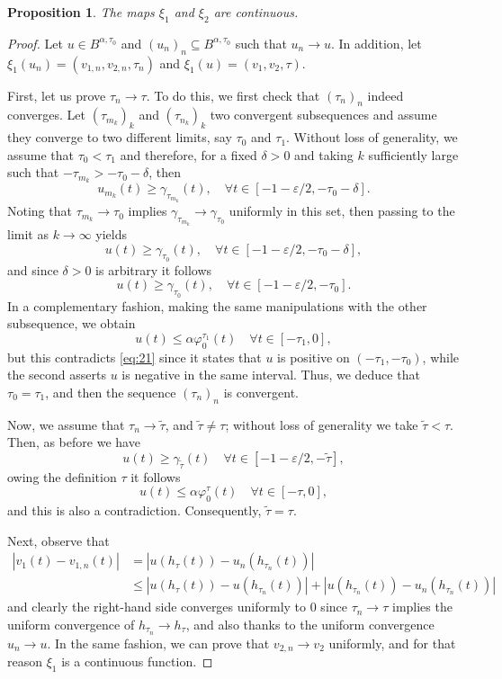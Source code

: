 \documentclass[a4paper,11pt]{article}
\theoremstyle{plain}
\newtheorem{prop}[thm]{Proposition}
\theoremstyle{definition}
\theoremstyle{definition}
\numberwithin{equation}{section}
\begin{document}
\begin{prop}
    The maps $\xi_1$ and $\xi_2$ are continuous.
\end{prop}
\begin{proof}
Let $u\in B^{\alpha,\tau_0}$ and $(u_n)_n\subseteq B^{\alpha,\tau_0}$ such that $u_n \to u$. In addition, let $\xi_1(u_n)=(v_{1,n},v_{2,n},\tau_n)$ and $\xi_1(u)=(v_1,v_2,\tau)$.

First, let us prove $\tau_n \to \tau$. To do this, we first check that $(\tau_n)_n$ indeed converges. Let $(\tau_{m_k})_k$ and $(\tau_{n_k})_k$ two convergent subsequences and assume they converge to two different limits, say $\tau_0$ and $\tau_1$. Without loss of generality, we assume that $\tau_0<\tau_1$ and therefore, for a fixed $\delta>0$ and taking $k$ sufficiently large such that $-\tau_{m_k}>-\tau_0 - \delta$, then
\[
    u_{m_k}(t) \geq \gamma_{\tau_{m_k}}(t), \quad \forall t\in[-1-\varepsilon/2, -\tau_0-\delta].
\]
Noting that $\tau_{m_k}\to \tau_0$ implies $\gamma_{\tau_{m_k}}\to \gamma_{\tau_0}$ uniformly in this set, then passing to the limit as $k\to \infty$ yields
\[
    u(t) \geq \gamma_{\tau_0}(t), \quad \forall t\in[-1-\varepsilon/2,-\tau_0-\delta],
\]
and since $\delta>0$ is arbitrary it follows
\begin{equation}\label{eq:21}
    u(t) \geq \gamma_{\tau_0}(t), \quad \forall t\in[-1-\varepsilon/2,-\tau_0].
\end{equation}
In a complementary fashion, making the same manipulations with the other subsequence, we obtain
\begin{equation}
    u(t) \leq \alpha \varphi_0^{\tau_1}(t) \quad \forall t\in[-\tau_1,0],
\end{equation}
but this contradicts \eqref{eq:21} since it states that $u$ is positive on $(-\tau_1,-\tau_0)$, while the second asserts $u$ is negative in the same interval. Thus, we deduce that $\tau_0=\tau_1$, and then the sequence $(\tau_n)_n$ is convergent.

Now, we assume that $\tau_n\to \tilde{\tau}$, and $\tilde{\tau}\neq \tau$; without loss of generality we take $\tilde{\tau}<\tau$. Then, as before we have
\[
    u(t) \geq \gamma_{\tilde{\tau}}(t) \quad \forall t\in[-1-\varepsilon/2,-\tilde{\tau}],
\]
owing the definition $\tau$ it follows
\[
    u(t)\leq \alpha \varphi_0^\tau (t) \quad \forall t\in[-\tau,0],
\]
and this is also a contradiction. Consequently, $\tilde{\tau}=\tau$.

Next, observe that
\begin{align*}
    |v_1(t) - v_{1,n}(t)| &= |u(h_\tau(t)) - u_n(h_{\tau_n}(t))| \\
    &\leq |u(h_\tau(t)) - u(h_{\tau_n}(t))| + |u(h_{\tau_n}(t)) - u_n(h_{\tau_n}(t))|
\end{align*}
and clearly the right-hand side converges uniformly to 0 since $\tau_n\to \tau$ implies the uniform convergence of $h_{\tau_n}\to h_\tau$, and also thanks to the uniform convergence $u_n\to u$. In the same fashion, we can prove that $v_{2,n}\to v_2$ uniformly, and for that reason $\xi_1$ is a continuous function.


\end{proof}
\end{document}
